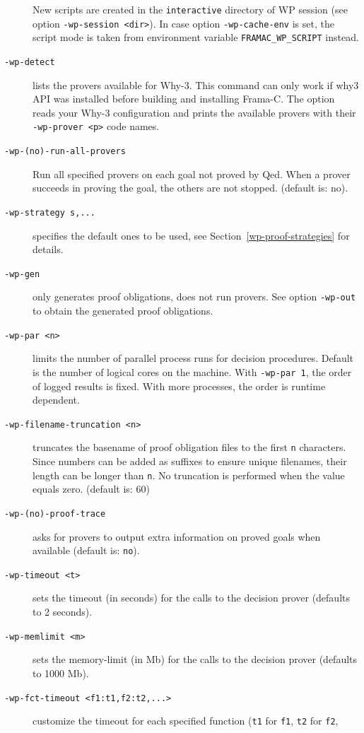 \begin{description}
\begin{itemize}
  \end{itemize}
  New scripts are created in the \texttt{interactive} directory of \textsf{WP}
  session (see option \texttt{-wp-session <dir>}).
  In case option \verb|-wp-cache-env| is set, the script mode is taken from environment
  variable \verb|FRAMAC_WP_SCRIPT| instead.
\item[\tt -wp-detect] lists the provers available for \textsf{Why-3}.
  This command can only work if \textsf{why3} API was installed before building and
  installing \textsf{Frama-C}.
  The option reads your \textsf{Why-3} configuration and prints the available
  provers with their \verb+-wp-prover <p>+ code names.
\item[\tt -wp-(no)-run-all-provers] Run all specified provers on each goal not
  proved by Qed. When a prover succeeds in proving the goal, the others are not
  stopped. (default is: no).
\item[\tt -wp-strategy s,...] specifies the default
  ones to be used, see Section~\ref{wp-proof-strategies} for details.
\item[\tt -wp-gen] only generates proof obligations, does not run provers.
  See option \texttt{-wp-out} to obtain the generated proof obligations.
\item[\tt -wp-par <n>] limits the number of parallel process runs for
  decision procedures. Default is the number of logical cores on the machine.
  With \texttt{-wp-par~1}, the order of logged results is fixed. With more
  processes, the order is runtime dependent.
\item[\tt -wp-filename-truncation <n>] truncates the basename of proof
  obligation files to the first \texttt{n} characters.
  Since numbers can be added as suffixes to ensure unique filenames,
  their length can be longer than \texttt{n}.
  No truncation is performed when the value equals zero. (default is: 60)
\item[\tt -wp-(no)-proof-trace] asks for provers to output extra information
  on proved goals when available (default is: \texttt{no}).
\item[\tt -wp-timeout <t>] sets the timeout (in seconds) for the calls
  to the decision prover (defaults to 2 seconds).
\item[\tt -wp-memlimit <m>] sets the memory-limit (in Mb) for the calls
  to the decision prover (defaults to 1000 Mb).
\item[\tt -wp-fct-timeout <f1:t1,f2:t2,...>] customize the timeout for each
  specified function (\texttt{t1} for \texttt{f1}, \texttt{t2} for \texttt{f2},

\end{description}
